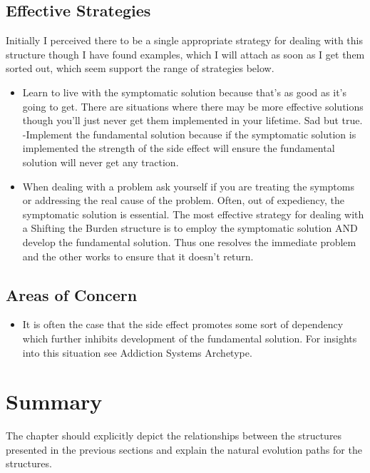 \documentclass[]{memoir}
\begin{document}
\subsection{Effective Strategies}

Initially I perceived there to be a single appropriate strategy for
dealing with this structure though I have found examples, which I will
attach as soon as I get them sorted out, which seem support the range of
strategies below.

\begin{itemize}
\itemsep1pt\parskip0pt
\item
  Learn to live with the symptomatic solution because that's as good as
  it's going to get. There are situations where there may be more
  effective solutions though you'll just never get them implemented in
  your lifetime. Sad but true. -Implement the fundamental solution
  because if the symptomatic solution is implemented the strength of the
  side effect will ensure the fundamental solution will never get any
  traction.
\item
  When dealing with a problem ask yourself if you are treating the
  symptoms or addressing the real cause of the problem. Often, out of
  expediency, the symptomatic solution is essential. The most effective
  strategy for dealing with a Shifting the Burden structure is to employ
  the symptomatic solution AND develop the fundamental solution. Thus
  one resolves the immediate problem and the other works to ensure that
  it doesn't return.
\end{itemize}

\subsection{Areas of Concern}

\begin{itemize}
\itemsep1pt\parskip0pt
\item
  It is often the case that the side effect promotes some sort of
  dependency which further inhibits development of the fundamental
  solution. For insights into this situation see Addiction Systems
  Archetype.
\end{itemize}

\section{Summary}

The chapter should explicitly depict the relationships between the
structures presented in the previous sections and explain the natural
evolution paths for the structures.
\end{document}
